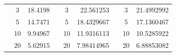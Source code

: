 \begin{table}[h]
\begin{tabular}{|ccrccrccr|}
\rowcolor[HTML]{DAE8FC} 
\multicolumn{1}{|c|}{\cellcolor[HTML]{FFFFC7}}                       & \multicolumn{1}{c|}{\cellcolor[HTML]{DAE8FC}3}         & \multicolumn{1}{r|}{\cellcolor[HTML]{DAE8FC}18.4198}    & \multicolumn{1}{c|}{\cellcolor[HTML]{FFFFC7}}                       & \multicolumn{1}{c|}{\cellcolor[HTML]{DAE8FC}3}         & \multicolumn{1}{r|}{\cellcolor[HTML]{DAE8FC}22.561253}  & \multicolumn{1}{c|}{\cellcolor[HTML]{FFFFC7}}                       & \multicolumn{1}{c|}{\cellcolor[HTML]{DAE8FC}3}         & 21.4992992                                              \\ \cline{2-3} \cline{5-6} \cline{8-9} 
\rowcolor[HTML]{DDFDFF} 
\multicolumn{1}{|c|}{\cellcolor[HTML]{FFFFC7}}                       & \multicolumn{1}{c|}{\cellcolor[HTML]{DDFDFF}5}         & \multicolumn{1}{r|}{\cellcolor[HTML]{DDFDFF}14.7471}    & \multicolumn{1}{c|}{\cellcolor[HTML]{FFFFC7}}                       & \multicolumn{1}{c|}{\cellcolor[HTML]{DDFDFF}5}         & \multicolumn{1}{r|}{\cellcolor[HTML]{DDFDFF}18.4329667} & \multicolumn{1}{c|}{\cellcolor[HTML]{FFFFC7}}                       & \multicolumn{1}{c|}{\cellcolor[HTML]{DDFDFF}5}         & 17.1360467                                              \\ \cline{2-3} \cline{5-6} \cline{8-9} 
\rowcolor[HTML]{DAE8FC} 
\multicolumn{1}{|c|}{\cellcolor[HTML]{FFFFC7}}                       & \multicolumn{1}{c|}{\cellcolor[HTML]{DAE8FC}10}        & \multicolumn{1}{r|}{\cellcolor[HTML]{DAE8FC}9.94967}    & \multicolumn{1}{c|}{\cellcolor[HTML]{FFFFC7}}                       & \multicolumn{1}{c|}{\cellcolor[HTML]{DAE8FC}10}        & \multicolumn{1}{r|}{\cellcolor[HTML]{DAE8FC}11.9316113} & \multicolumn{1}{c|}{\cellcolor[HTML]{FFFFC7}}                       & \multicolumn{1}{c|}{\cellcolor[HTML]{DAE8FC}10}        & 10.5285922                                              \\ \cline{2-3} \cline{5-6} \cline{8-9} 
\rowcolor[HTML]{DDFDFF} 
\multicolumn{1}{|c|}{\cellcolor[HTML]{FFFFC7}}                       & \multicolumn{1}{c|}{\cellcolor[HTML]{DDFDFF}20}        & \multicolumn{1}{r|}{\cellcolor[HTML]{DDFDFF}5.62915}    & \multicolumn{1}{c|}{\cellcolor[HTML]{FFFFC7}}                       & \multicolumn{1}{c|}{\cellcolor[HTML]{DDFDFF}20}        & \multicolumn{1}{r|}{\cellcolor[HTML]{DDFDFF}7.98414965} & \multicolumn{1}{c|}{\cellcolor[HTML]{FFFFC7}}                       & \multicolumn{1}{c|}{\cellcolor[HTML]{DDFDFF}20}        & 6.88853082                                              \\ \cline{2-3} \cline{5-6} \cline{8-9} 

\end{tabular}
\end{table}
